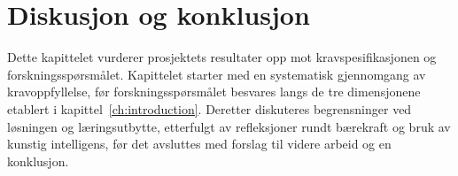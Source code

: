\chapter{Diskusjon og konklusjon}
\label{ch:diskusjon}

Dette kapittelet vurderer prosjektets resultater opp mot kravspesifikasjonen og forskningsspørsmålet. Kapittelet starter med en systematisk gjennomgang av kravoppfyllelse, før forskningsspørsmålet besvares langs de tre dimensjonene etablert i kapittel~\ref{ch:introduction}. Deretter diskuteres begrensninger ved løsningen og læringsutbytte, etterfulgt av refleksjoner rundt bærekraft og bruk av kunstig intelligens, før det avsluttes med forslag til videre arbeid og en konklusjon.









